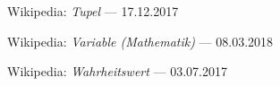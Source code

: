 \begin{flushleft}
\begin{thebibliography}{12}
		 Wikipedia:
		\emph                               {Tupel}
		--- 17.12.2017

		 Wikipedia:
		\emph                               {Variable  (Mathematik)}
		--- 08.03.2018

		 Wikipedia:
		\emph                               {Wahrheitswert}
		--- 03.07.2017

		\clearpage %
	\end{thebibliography}
\end{flushleft}

